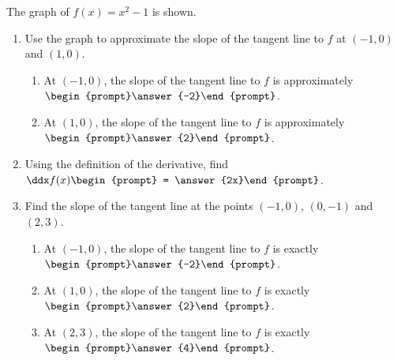 \documentclass{ximera}
\author{Gregory Hartman \and Matthew Carr}
\begin{document}
\begin{exercise}





The graph of $f(x)=x^2-1$ is shown. 
	\begin{enumerate}
	\item		Use the graph to approximate the slope of the tangent line to $f$ at $(-1,0)$ and $(1,0)$.
	 \begin{enumerate}[label=\emph{(\roman*)}]
	  \item	 At $(-1,0)$, the slope of the tangent line to $f$ is approximately $\begin{prompt}\answer{-2}\end{prompt}$.
	  \item	 At $(1,0)$, the slope of the tangent line to $f$ is approximately $\begin{prompt}\answer{2}\end{prompt}$.
	 \end{enumerate}
	\item		Using the definition of the derivative, find $\ddx f(x)\begin{prompt} = \answer{2x}\end{prompt}$.
	\item		Find the slope of the tangent line at the points $(-1,0)$, $(0,-1)$ and $(2,3)$.
	\begin{enumerate}[label=\emph{(\roman*)}]
	  \item	 At $(-1,0)$, the slope of the tangent line to $f$ is exactly $\begin{prompt}\answer{-2}\end{prompt}$.
	  \item	 At $(1,0)$, the slope of the tangent line to $f$ is exactly $\begin{prompt}\answer{2}\end{prompt}$.
	  \item	 At $(2,3)$, the slope of the tangent line to $f$ is exactly $\begin{prompt}\answer{4}\end{prompt}$.
	 \end{enumerate}
	\end{enumerate}


\end{exercise}
\end{document}

